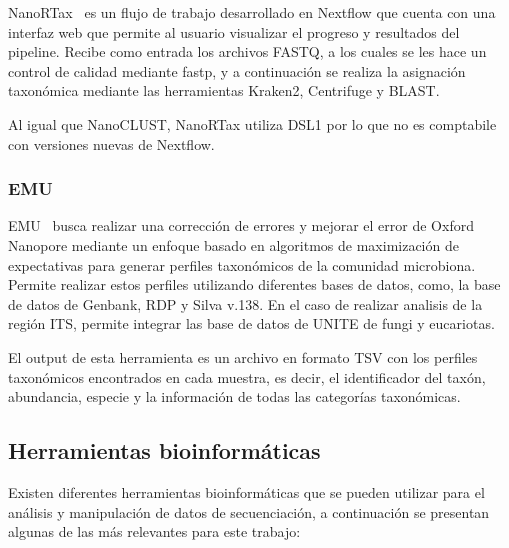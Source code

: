 NanoRTax~\cite{RODRIGUEZPEREZ20225350} es un flujo de trabajo desarrollado en Nextflow que cuenta con una interfaz web que permite al usuario visualizar el progreso y resultados del pipeline.
Recibe como entrada los archivos FASTQ, a los cuales se les hace un control de calidad mediante fastp, y a continuación se realiza la asignación taxonómica mediante las herramientas Kraken2, Centrifuge y BLAST. 

Al igual que NanoCLUST, NanoRTax utiliza DSL1 por lo que no es comptabile con versiones nuevas de Nextflow.
\subsubsection{EMU}
EMU~\cite{curry2022emu} busca realizar una corrección de errores y mejorar el error de Oxford Nanopore mediante un enfoque basado en algoritmos de maximización de expectativas para generar perfiles taxonómicos de la comunidad microbiona. Permite realizar estos perfiles utilizando diferentes bases de datos, como, la base de datos de Genbank,  RDP y Silva v.138. En el caso de realizar analisis de la región ITS, permite integrar las base de datos de UNITE de fungi y eucariotas.

El output de esta herramienta es un archivo en formato TSV con los perfiles taxonómicos encontrados en cada muestra, es decir, el identificador del taxón, abundancia, especie y la información de todas las categorías taxonómicas. 



\subsection{Herramientas bioinformáticas}
Existen diferentes herramientas bioinformáticas que se pueden utilizar para el análisis y manipulación de datos de secuenciación, a continuación se presentan algunas de las más relevantes para este trabajo:

